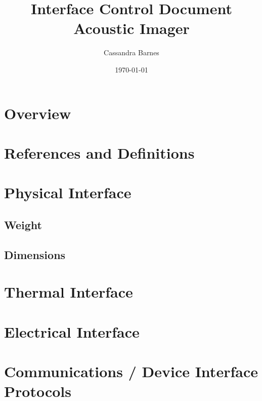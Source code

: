 \documentclass[12pt]{article}  %
\title{Interface Control Document\\Acoustic Imager}
\author{Cassandra Barnes}
\date{\today}
\begin{document}
\maketitle 


\pagebreak 

\section*{Overview}


\section*{References and Definitions}


\section*{Physical Interface}


\subsection*{Weight}


\subsection*{Dimensions}


\section*{Thermal Interface}


\section*{Electrical Interface}


\section*{Communications / Device Interface Protocols} %
\end{document}
